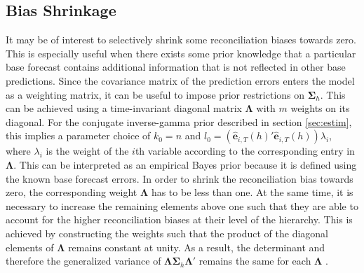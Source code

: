 \documentclass[a4paper,fleqn,11pt]{article}
\begin{document}
\subsection{Bias Shrinkage}\label{sec:weighting}
It may be of interest to selectively shrink some reconciliation biases towards zero. This is especially useful when there exists some prior knowledge that a particular base forecast contains additional information that is not reflected in other base predictions. Since the covariance matrix of the prediction errors enters the model as a weighting matrix, it can be useful to impose prior restrictions on $\boldsymbol{\Sigma}_h$. This can be achieved using a time-invariant diagonal matrix $\boldsymbol{\Lambda}$ with $m$ weights on its diagonal. For the conjugate inverse-gamma prior described in section \ref{sec:estim}, this implies a parameter choice of $k_0 = n $ and $l_0 = (\mathbf{\hat{e}}_{i,T}(h)'\mathbf{\hat{e}}_{i,T}(h)) \lambda_i$, where $\lambda_i$ is the weight of the $i$th variable according to the corresponding entry in $\boldsymbol{\Lambda}$.
This can be interpreted as an empirical Bayes prior because it is defined using the known base forecast errors. In order to shrink the reconciliation bias towards zero, the corresponding weight $\boldsymbol{\Lambda}$ has to be less than one. At the same time, it is necessary to increase the remaining elements above one such that they are able to account for the higher reconciliation biases at their level of the hierarchy. This is achieved by constructing the weights such that the product of the diagonal elements of $\boldsymbol{\Lambda}$ remains constant at unity. As a result, the determinant and therefore the generalized variance of $\boldsymbol{\Lambda} \boldsymbol{\Sigma}_h \boldsymbol{\Lambda}'$ remains the same for each $\boldsymbol{\Lambda}$ \citep{Mustonen1997}.
\end{document}
